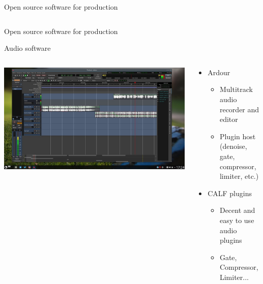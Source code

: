 \begin{frame}{Open source software for production}
\begin{columns}
    \end{columns}

\end{frame}

\begin{frame}{Open source software for production}

    Audio software

    \begin{columns}

    \begin{column}{0.4\linewidth}
        \includegraphics[width=\linewidth]{maxresdefault.jpg}
    \end{column}

    \begin{column}{0.6\linewidth}
        \begin{itemize}
            \item Ardour
            \begin{itemize}
                \item Multitrack audio recorder and editor
                \item Plugin host (denoise, gate, compressor, limiter, etc.)
            \end{itemize}
      
            \item CALF plugins
            \begin{itemize}
                \item Decent and easy to use audio plugins
                \item Gate, Compressor, Limiter...
            \end{itemize}
        \end{itemize}
    \end{column}
    
    \end{columns}


\end{frame}
